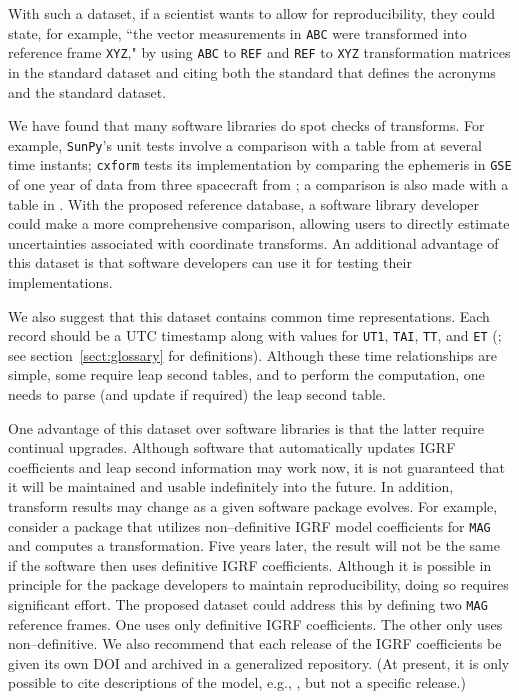 \documentclass[draft]{agujournal2019}
\begin{document}
With such a dataset, if a scientist wants to allow for reproducibility, they could state, for example, ``the vector measurements in \texttt{ABC} were transformed into reference frame \texttt{XYZ}," by using \texttt{ABC} to \texttt{REF} and \texttt{REF} to \texttt{XYZ} transformation matrices in the standard dataset and citing both the standard that defines the acronyms and the standard dataset.

We have found that many software libraries do spot checks of transforms. For example, \texttt{SunPy}'s unit tests \cite{SunPy} involve a comparison with a table from  at several time instants; \texttt{cxform} \cite{cxform} tests its implementation by comparing the ephemeris in \texttt{GSE} of one year of data from three spacecraft from ; a comparison is also made with a table in . With the proposed reference database, a software library developer could make a more comprehensive comparison, allowing users to directly estimate uncertainties associated with coordinate transforms. An additional advantage of this dataset is that software developers can use it for testing their implementations.

We also suggest that this dataset contains common time representations. Each record should be a UTC timestamp along with values for \texttt{UT1}, \texttt{TAI}, \texttt{TT}, and \texttt{ET} (; see section~\ref{sect:glossary} for definitions). Although these time relationships are simple, some require leap second tables, and to perform the computation, one needs to parse (and update if required) the leap second table.



One advantage of this dataset over software libraries is that the latter require continual upgrades. Although software that automatically updates IGRF coefficients and leap second information may work now, it is not guaranteed that it will be maintained and usable indefinitely into the future. In addition, transform results may change as a given software package evolves. For example, consider a package that utilizes non--definitive IGRF model coefficients for \texttt{MAG} and computes a transformation. Five years later, the result will not be the same if the software then uses definitive IGRF coefficients. Although it is possible in principle for the package developers to maintain reproducibility, doing so requires significant effort. The proposed dataset could address this by defining two \texttt{MAG} reference frames. One uses only definitive IGRF coefficients. The other only uses non--definitive. We also recommend that each release of the IGRF coefficients be given its own DOI and archived in a generalized repository. (At present, it is only possible to cite descriptions of the model, e.g., , but not a specific release.)
\end{document}
